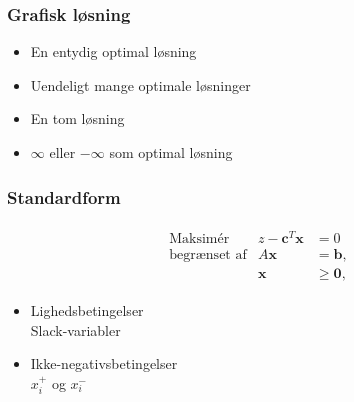 %
%
%
%
%
%
%

\begin{frame}
\frametitle{Grafisk løsning}
\begin{itemize}
\item En entydig optimal løsning
\item Uendeligt mange optimale løsninger 
\item En tom løsning
\item $\infty$ eller $-\infty$ som optimal løsning  
\end{itemize}
\end{frame}

\begin{frame}
\frametitle{Standardform}
\begin{align*}
\begin{array}{lrl}
\text{Maksimér}		&z - \textbf{c}^T\textbf{x}	&	=0		\\
\text{begrænset af}	&A\textbf{x}	&=\mathbf{b},	\\
					&\mathbf{x}				&\geq \mathbf{0},
\end{array}
\end{align*}
\begin{itemize}
\item Lighedsbetingelser \\
 		Slack-variabler
\item Ikke-negativsbetingelser \\ 
		$x_i^+$ og $x_i^-$
\end{itemize}
\end{frame}

